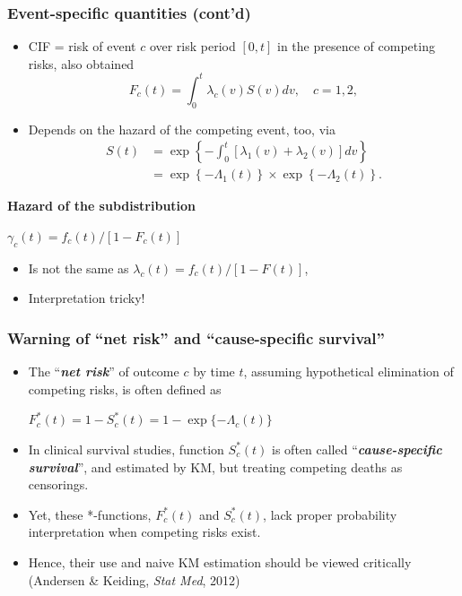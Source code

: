 \documentclass[handout,12pt]{beamer}
\begin{document}
\begin{frame}
\frametitle{Event-specific quantities (cont'd)}
\begin{itemize}
\item CIF = risk of event $c$ over risk period $[0,t]$ in the presence of competing risks, also obtained 
$$ F_c(t) = \int_0^t \lambda_c(v) S(v) dv, \quad c = 1,2, $$
\item
Depends on the hazard of the competing event, too, 
via 
\begin{align*} 
S(t) & = \exp\left\{ - \int_0^t [\lambda_1(v) + \lambda_2(v)]dv 
 \right\} \\
 & = \exp\left\{ - \Lambda_1(t) \right\} \times        \exp\left\{ - \Lambda_2(t) \right\} .
\end{align*}
\end{itemize}
\textbf{Hazard of the subdistribution} \\
\begin{center}
  $\gamma_c(t) = {f_c(t)}/[1 - F_c(t)] $
\end{center}	
\begin{itemize}
\item Is not the same as 
$\lambda_c(t) = f_c(t)/[1-F(t)]$,
\item Interpretation tricky!
\end{itemize}
\end{frame} 


\begin{frame}
\frametitle{Warning of ``net risk'' and ``cause-specific survival''}

\begin{itemize}                              
\item
The ``\textbf{\textit{net risk}}'' of outcome $c$ by time $t$, 
assuming hypothetical elimination of competing risks,
is often defined as
\begin{center}
$ F_c^*(t) = 1 - S_c^*(t) = 1- \exp\{ - \Lambda_c(t) \} $
\end{center}
\medskip
\item
In clinical survival studies, function 
$S_c^*(t)$ is often called ``\textbf{\textit{cause-specific survival}}'',
and estimated by KM, but treating competing deaths
as censorings.
\medskip
\item
Yet, these *-functions, $ F_c^*(t)$ and $S_c^*(t)$, lack proper probability interpretation when
 competing risks exist.
\medskip
\item
Hence, their use and naive KM estimation should be viewed critically
(Andersen \& Keiding, \textit{Stat Med}, 2012)
\end{itemize}
\end{frame}
\end{document}
